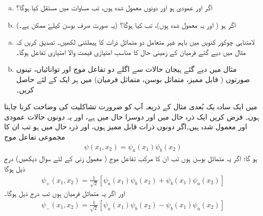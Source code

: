 \begin{enumerate}[a.]
\item
اگر  اور  عمودی ہو اور دونوں معمول شدہ ہوں، تب مساوات  میں مستقل  کیا ہوگا؟ 
\item
اگر  ہو ( اور یہ معمول شدہ ہوں)، تب  کیا ہوگا؟ (یہ صورت صرف بوسن کیلۓ ممکن ہے۔)
\end{enumerate}
\begin{enumerate}[a.]
\item
لامتناہی چوکور کنویں میں باہم غیر متعامل دو متماثل ذرات کا ہیملٹنی لکھیں۔ تصدیق کریں کہ مثال  میں دیے گئے فرمیان کے زمینی حال  کا مناسب امتیازی قیمت والا امتیازی تفاعل ہوگا۔ 
\item
مثال  میں دیے گئے ہیجان حالات سے اگلے دو تفاعل موج اور توانائیاں، تینوں صورتوں ( قابل ممیز، متماثل بوسن، متماثل فرمیان) میں ہر ایک کے لئے حاصل کریں۔
\end{enumerate}


میں ایک سادہ یک بُعدی مثال کے ذریعہ آپ کو ضرورت تشاکلیت کی وضاحت کرنا چاہتا ہوں۔ فرض کریں ایک ذرہ حال  میں اور دوسرا حال  میں ہے، اور یہ دونوں حالات عمودی اور معمول شدہ ہیں۔اگر دونوں ذرات قابل ممیز ہوں، اور ذرہ  حال  میں ہو تب ان کا مجموعی تفاعل موج
\begin{align}\label{مساوات_متماثل_مجموعی_تفاعل_موج_قابل_ممیز}
	\psi(x_1, x_2)=\psi_a(x_1)\psi_b(x_2)
\end{align}
ہو گا؛ اگر یہ متماثل بوسن ہوں تب ان کا مرکب تفاعل موج ( معمول زنی کے لئے سوال  دیکھیں) درج ذیل ہوگا
\begin{align}\label{مساوات_متماثل_مجموعی_تفاعل_موج_متماثل_بوسن}
	\psi_+(x_1, x_2) = \frac{1}{\sqrt{2}}[\psi_a(x_1)\psi_b(x_2)+\psi_b(x_1)\psi_a(x_2)]
\end{align}
اور اگر یہ متماثل فرمیان ہوں تب درج ذیل ہوگا۔
\begin{align}\label{مساوات_متماثل_مجموعی_تفاعل_موج_متماثل_فرمیان}
	\psi_-(x_1, x_2)=\frac{1}{\sqrt{2}}[\psi_a(x_1)\psi_b(x_2)-\psi_b(x_1)\psi_a(x_2)]
\end{align}

